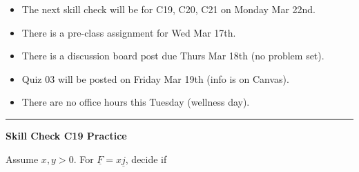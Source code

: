 \documentclass[12pt,letterpaper,noanswers]{exam}
\newcommand{\mb}[1]{\underline{#1}}
\begin{document}
 \pdfpageheight 11in 
  \pdfpagewidth 8.5in





\begin{itemize}
\itemsep0em
      \item The next skill check will be for C19, C20, C21 on Monday Mar 22nd.
    \item There is a pre-class assignment for Wed Mar 17th.
    \item There is a discussion board post due Thurs Mar 18th (no problem set).
    \item Quiz 03 will be posted on Friday Mar 19th (info is on Canvas).
    \item There are no office hours this Tuesday (wellness day).
\end{itemize}

\hrule
\vspace{0.2cm}

\noindent\textbf{Skill Check C19 Practice}
\begin{questions}
\question Assume $x,y>0$.  For $\mb F = x\mb j$, decide if
\end{questions}
\end{document}
